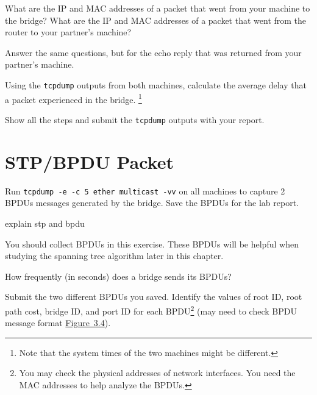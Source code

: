 \documentclass{../UTNetLab}
\begin{document}
    \begin{report}
    \item What are the IP and MAC addresses of a packet that went from your machine to the bridge?
    What are the IP and MAC addresses of a packet that went from the router to your partner’s machine?

    \item Answer the same questions, but for the echo reply that was returned from your partner’s machine.
    
    \item Using the \lstinline{tcpdump} outputs from both machines, calculate the average delay that a packet experienced in the bridge. \footnote{Note that the system times of the two machines might be different.}
    \end{report}

    Show all the steps and submit the \lstinline{tcpdump} outputs with your report.

\section{STP/BPDU Packet}
    Run \lstinline{tcpdump -e -c 5 ether multicast -vv} on all machines to capture 2 BPDUs messages generated by the bridge.
    Save the BPDUs for the lab report.

explain stp and bpdu

    You should collect BPDUs in this exercise.
    These BPDUs will be helpful when studying the spanning tree algorithm later in this chapter.

    \begin{report}
    \item How frequently (in seconds) does a bridge sends its BPDUs?

    \item Submit the two different BPDUs you saved.
    Identify the values of root ID, root path cost, bridge ID, and port ID for each BPDU\footnote{You may check the physical addresses of network interfaces. You need the MAC addresses to help analyze the BPDUs.} (may need to check BPDU message format \hyperref[fig:3.4]{Figure~3.4}).
    \end{report}
\end{document}
